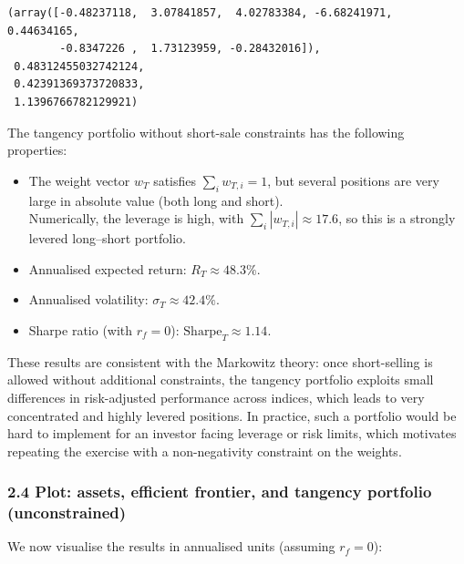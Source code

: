 \documentclass[11pt]{article}
\begin{document}
            \begin{tcolorbox}[breakable, size=fbox, boxrule=.5pt, pad at break*=1mm, opacityfill=0]
\begin{Verbatim}[commandchars=\\\{\}]
(array([-0.48237118,  3.07841857,  4.02783384, -6.68241971,  0.44634165,
        -0.8347226 ,  1.73123959, -0.28432016]),
 0.48312455032742124,
 0.42391369373720833,
 1.1396766782129921)
\end{Verbatim}
\end{tcolorbox}
        
    The tangency portfolio without short-sale constraints has the following
properties:

\begin{itemize}
\item
  The weight vector \(w_T\) satisfies \(\sum_i w_{T,i} = 1\), but
  several positions are very large in absolute value (both long and
  short).\\
  Numerically, the leverage is high, with
  \(\sum_i |w_{T,i}| \approx 17.6\), so this is a strongly levered
  long--short portfolio.
\item
  Annualised expected return: \(R_T \approx 48.3\%\).
\item
  Annualised volatility: \(\sigma_T \approx 42.4\%\).
\item
  Sharpe ratio (with \(r_f = 0\)): \(\text{Sharpe}_T \approx 1.14\).
\end{itemize}

These results are consistent with the Markowitz theory: once
short-selling is allowed without additional constraints, the tangency
portfolio exploits small differences in risk-adjusted performance across
indices, which leads to very concentrated and highly levered positions.
In practice, such a portfolio would be hard to implement for an investor
facing leverage or risk limits, which motivates repeating the exercise
with a non-negativity constraint on the weights.

    \hypertarget{plot-assets-efficient-frontier-and-tangency-portfolio-unconstrained}{%
\subsubsection{2.4 Plot: assets, efficient frontier, and tangency
portfolio
(unconstrained)}\label{plot-assets-efficient-frontier-and-tangency-portfolio-unconstrained}}

We now visualise the results in annualised units (assuming \(r_f = 0\)):
\end{document}

